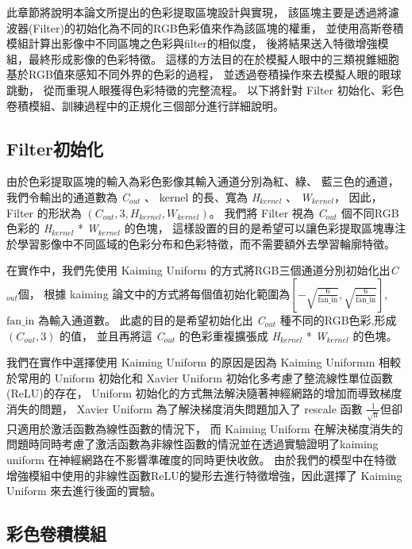 \documentclass[class=NCU_thesis, crop=false]{standalone}
\begin{document}
此章節將說明本論文所提出的色彩提取區塊設計與實現，
該區塊主要是透過將濾波器(Filter)的初始化為不同的RGB色彩值來作為該區塊的權重，
並使用高斯卷積模組計算出影像中不同區塊之色彩與filter的相似度，
後將結果送入特徵增強模組，最終形成影像的色彩特徵。
這樣的方法目的在於模擬人眼中的三類視錐細胞基於RGB值來感知不同外界的色彩的過程，
並透過卷積操作來去模擬人眼的眼球跳動，
從而重現人眼獲得色彩特徵的完整流程。
以下將針對 Filter 初始化、彩色卷積模組、訓練過程中的正規化三個部分進行詳細說明。

	\subsection{Filter初始化}

	由於色彩提取區塊的輸入為彩色影像其輸入通道分別為紅、綠、 藍三色的通道，
	我們令輸出的通道數為 \textit{C}$_{out}$ 、 kernel 的長、寬為 \textit{H}$_{kernel}$ 、 \textit{W}$_{kernel}$，
	因此， Filter 的形狀為 $\left(C_{out} , 3, H_{kernel}, W_{kernel}\right)$。
	我們將 Filter 視為 \textit{C}$_{out}$ 個不同RGB色彩的 \textit{H}$_{kernel}$ * \textit{W}$_{kernel}$ 的色塊，
	這樣設置的目的是希望可以讓色彩提取區塊專注於學習影像中不同區域的色彩分布和色彩特徵，而不需要額外去學習輪廓特徵。

	在實作中，我們先使用 Kaiming Uniform 的方式將RGB三個通道分別初始化出\textit{C}$_{out}$個，
	根據 kaiming 論文\cite{DBLP:journals/corr/HeZR015}中的方式將每個值初始化範圍為$[-\sqrt{\frac{6}{\text{fan\_in}}}, \sqrt{\frac{6}{\text{fan\_in}}}]$,
	$\text{fan\_in}$ 為輸入通道數。
	此處的目的是希望初始化出 \textit{C}$_{out}$ 種不同的RGB色彩,形成 $\left(C_{out} , 3\right)$ 的值，
	並且再將這 \textit{C}$_{out}$ 的色彩重複擴張成 \textit{H}$_{kernel}$ * \textit{W}$_{kernel}$ 的色塊。

	我們在實作中選擇使用 Kaiming Uniform 的原因是因為 Kaiming Uniformm 相較於常用的 Uniform 初始化和 Xavier Uniform\cite{pmlr-v9-glorot10a} 初始化多考慮了整流線性單位函數(ReLU)的存在，
	Uniform 初始化的方式無法解決隨著神經網路的增加而導致梯度消失的問題，
	Xavier Uniform 為了解決梯度消失問題加入了 rescale 函數 $\frac{1}{\sqrt{\text{n}}}$但卻只適用於激活函數為線性函數的情況下，
	而 Kaiming Uniform 在解決梯度消失的問題時同時考慮了激活函數為非線性函數的情況並在\cite{DBLP:journals/corr/HeZR015}透過實驗證明了kaiming uniform 在神經網路在不影響準確度的同時更快收斂。
	由於我們的模型中在特徵增強模組中使用的非線性函數ReLU的變形去進行特徵增強，因此選擇了 Kaiming Uniform 來去進行後面的實驗。

	\subsection{彩色卷積模組}
\end{document}
